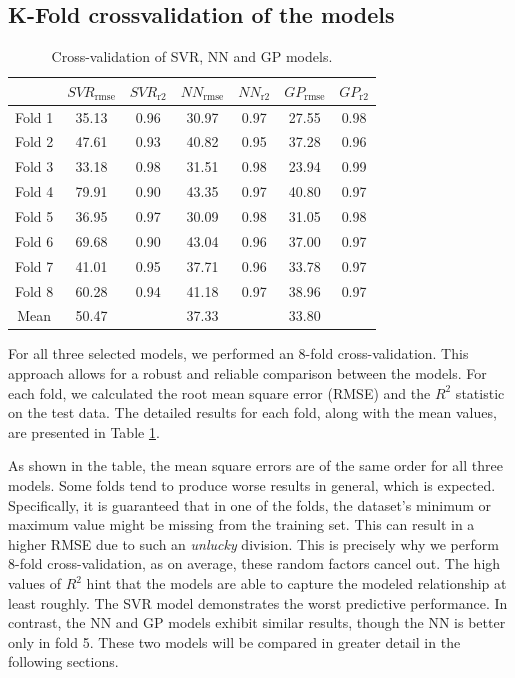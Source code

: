 \subsection*{K-Fold crossvalidation of the models}
\begin{table}[h]
	\centering
	\caption{Cross-validation of SVR, NN and GP models.} 
	\begin{tabular}{ c c c c c c c }
		\toprule
		\  & $SVR_\mathrm{rmse}$& $SVR_\mathrm{r2}$ & $NN_\mathrm{rmse}$   & $NN_\mathrm{r2}$ & $GP_\mathrm{rmse}$ & $GP_\mathrm{r2}$ \\ 
		\midrule
		Fold 1 & 35.13 & 0.96 & 30.97 & 0.97 & 27.55 & 0.98 \\ 
		Fold 2 & 47.61 & 0.93 & 40.82 & 0.95 & 37.28 & 0.96 \\ 
		Fold 3 & 33.18 & 0.98 & 31.51 & 0.98 & 23.94 & 0.99 \\ 
		Fold 4 & 79.91 & 0.90 & 43.35 & 0.97 & 40.80 & 0.97 \\ 
		Fold 5 & 36.95 & 0.97 & 30.09 & 0.98 & 31.05 & 0.98 \\ 
		Fold 6 & 69.68 & 0.90 & 43.04 & 0.96 & 37.00 & 0.97 \\ 
		Fold 7 & 41.01 & 0.95 & 37.71 & 0.96 & 33.78 & 0.97 \\ 
		Fold 8 & 60.28 & 0.94 & 41.18 & 0.97 & 38.96 & 0.97 \\ 
		\midrule
		Mean & 50.47 & & 37.33 & & 33.80 & \\ 
		\bottomrule
	\end{tabular}
	\label{tab:cross-val} 
\end{table}

For all three selected models, we performed an 8-fold cross-validation. This approach allows for a robust and reliable comparison between the models. For each fold, we calculated the root mean square error (RMSE) and the $R^2$ statistic on the test data. The detailed results for each fold, along with the mean values, are presented in Table \ref{tab:cross-val}.

As shown in the table, the mean square errors are of the same order for all three models. Some folds tend to produce worse results in general, which is expected. Specifically, it is guaranteed that in one of the folds, the dataset's minimum or maximum value might be missing from the training set. This can result in a higher RMSE due to such an \textit{unlucky} division. This is precisely why we perform 8-fold cross-validation, as on average, these random factors cancel out. The high values of $R^2$ hint that the models are able to capture the modeled relationship at least roughly. The SVR model demonstrates the worst predictive performance. In contrast, the NN and GP models exhibit similar results, though the NN is better only in fold 5. These two models will be compared in greater detail in the following sections.


